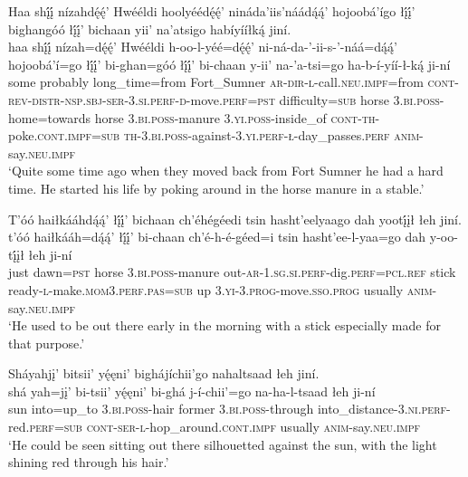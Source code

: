 \ea\label{ex:text1-30-16}
Haa shį́į́ nízahdę́ę́’ Hwééldi hoolyéédę́ę́’ nináda’iis’náádą́ą́’ hojoobá’ígo łį́į́’ bighangóó łį́į́’ bichaan yii’ na’atsigo habíyííłką́ jiní.\\
\gll haa	shį́į́	nízah=dę́ę́’	Hwééldi h-oo-l-yéé=dę́ę́’	ni-ná-da-’-ii-s-’-náá=dą́ą́’	hojoobá’í=go	łį́į́’	bi-ghan=góó	łį́į́’	bi-chaan	y-ii’	na-’a-tsi=go	ha-b-í-yíí-ł-ką́	ji-ní\\
     some	probably	long\_time=from	Fort\_Sumner \textsc{ar}-\textsc{dir}-\textsc{l}-call.\textsc{neu}.\textsc{impf}=from	\textsc{cont}-\textsc{rev}-\textsc{distr}-\textsc{nsp}.\textsc{sbj}-\textsc{ser}-3.\textsc{si}.\textsc{perf}-\textsc{d}-move.\textsc{perf}=\textsc{pst}	difficulty=\textsc{sub}	horse	3.\textsc{bi}.\textsc{poss}-home=towards	horse	3.\textsc{bi}.\textsc{poss}-manure	3.\textsc{yi}.\textsc{poss}-inside\_of	\textsc{cont}-\textsc{th}-poke.\textsc{cont}.\textsc{impf}=\textsc{sub}	\textsc{th}-3.\textsc{bi}.\textsc{poss}-against-3.\textsc{yi}.\textsc{perf}-\textsc{ł}-day\_passes.\textsc{perf}	\textsc{anim}-say.\textsc{neu}.\textsc{impf}\\
\glt `Quite some time ago when they moved back from Fort Sumner he had a hard time. He started his life by poking around in the horse manure in a stable.'
\z

\ea\label{ex:text1-30-17}
T’óó haiłkááhdą́ą́’ łį́į́’ bichaan ch’éhégéedi tsin hasht’eelyaago dah yootį́įł łeh jiní.\\
\gll t’óó	haiłkááh=dą́ą́’	łį́į́’	bi-chaan	ch’é-h-é-géed=i	tsin	hasht’ee-l-yaa=go	dah	y-oo-tį́įł	łeh	ji-ní\\
     just	dawn=\textsc{pst}	horse	3.\textsc{bi}.\textsc{poss}-manure	out-\textsc{ar}-1.\textsc{sg}.\textsc{si}.\textsc{perf}-dig.\textsc{perf}=\textsc{pcl}.\textsc{ref}	stick	ready-\textsc{l}-make.\textsc{mom}3.\textsc{perf}.\textsc{pas}=\textsc{sub}	up	3.\textsc{yi}-3.\textsc{prog}-move.\textsc{sso}.\textsc{prog}	usually	\textsc{anim}-say.\textsc{neu}.\textsc{impf}\\
\glt `He used to be out there early in the morning with a stick especially made for that purpose.'
\z

\ea\label{ex:text1-30-18}
Sháyahjį’ bitsii’ yę́ęni’ bighájíchii’go nahaltsaad łeh jiní.\\
\gll shá yah=jį’	bi-tsii’	yę́ęni’	bi-ghá j-í-chii’=go	na-ha-l-tsaad	łeh	ji-ní\\
     sun into=up\_to	3.\textsc{bi}.\textsc{poss}-hair	former	3.\textsc{bi}.\textsc{poss}-through into\_distance-3.\textsc{ni}.\textsc{perf}-red.\textsc{perf}=\textsc{sub}	\textsc{cont}-\textsc{ser}-\textsc{l}-hop\_around.\textsc{cont}.\textsc{impf}	usually	\textsc{anim}-say.\textsc{neu}.\textsc{impf}\\
\glt `He could be seen sitting out there silhouetted against the sun, with the light shining red through his hair.'
\z


